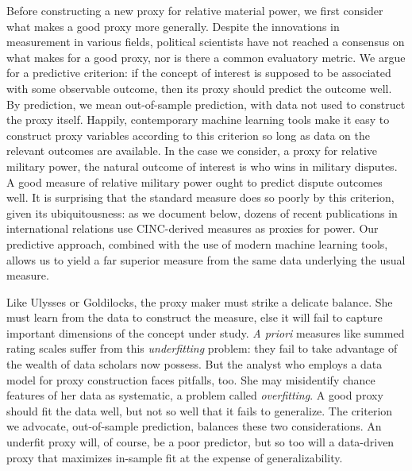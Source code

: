 Before constructing a new proxy for relative material power, we first consider what makes a good proxy more generally.
Despite the innovations in measurement in various fields, political scientists have not reached a consensus on what makes for a good proxy, nor is there a common evaluatory metric.
We argue for a predictive criterion:  if the concept of interest is supposed to be associated with some observable outcome, then its proxy should predict the outcome well.
By prediction, we mean out-of-sample prediction, with data not used to construct the proxy itself.
Happily, contemporary machine learning tools make it easy to construct proxy variables according to this criterion so long as data on the relevant outcomes are available.
In the case we consider, a proxy for relative military power, the natural outcome of interest is who wins in military disputes.
A good measure of relative military power ought to predict dispute outcomes well.
It is surprising that the standard measure does so poorly by this criterion, given its ubiquitousness: as we document below, dozens of recent publications in international relations use CINC-derived measures as proxies for power.
Our predictive approach, combined with the use of modern machine learning tools, allows us to yield a far superior measure from the same data underlying the usual measure.

Like Ulysses or Goldilocks, the proxy maker must strike a delicate balance.
She must learn from the data to construct the measure, else it will fail to capture important dimensions of the concept under study.
\emph{A priori} measures like summed rating scales suffer from this \emph{underfitting} problem: they fail to take advantage of the wealth of data scholars now possess.
But the analyst who employs a data model for proxy construction faces pitfalls, too.
She may misidentify chance features of her data as systematic, a problem called \emph{overfitting}.
A good proxy should fit the data well, but not so well that it fails to generalize.
The criterion we advocate, out-of-sample prediction, balances these two considerations.
An underfit proxy will, of course, be a poor predictor, but so too will a data-driven proxy that maximizes in-sample fit at the expense of generalizability.

